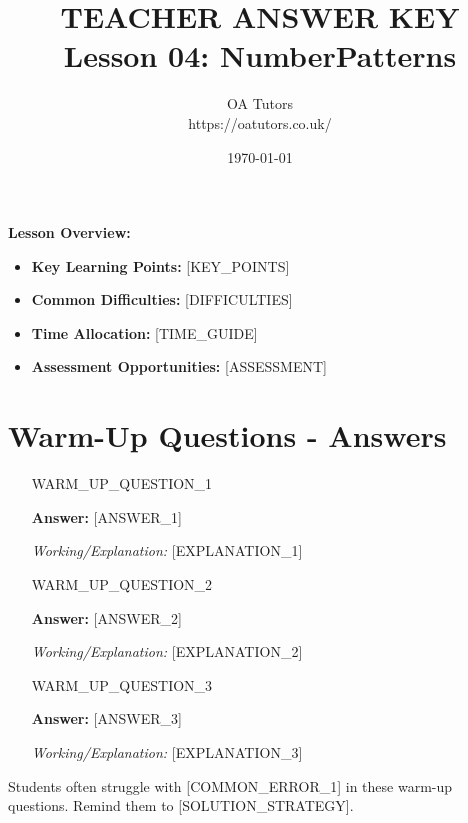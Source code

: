 \documentclass[a4paper,12pt]{article}
\begin{document}
\title{\textcolor{oared}{\Huge TEACHER ANSWER KEY} \\ 
       \textcolor{oablue}{\Large Lesson 04: NumberPatterns}}
\author{\textcolor{oablue}{OA Tutors} \\ 
        \textcolor{oagray}{https://oatutors.co.uk/}}
\date{\textcolor{oagray}{\today}}

\maketitle

\begin{teachingtip}
\textbf{Lesson Overview:}
\begin{itemize}
    \item \textbf{Key Learning Points:} [KEY_POINTS]
    \item \textbf{Common Difficulties:} [DIFFICULTIES]
    \item \textbf{Time Allocation:} [TIME_GUIDE]
    \item \textbf{Assessment Opportunities:} [ASSESSMENT]
\end{itemize}
\end{teachingtip}

\section{Warm-Up Questions - Answers}

\begin{enumerate}
    \item [WARM_UP_QUESTION_1]
    
    \textcolor{oared}{\textbf{Answer:} [ANSWER_1]}
    
    \textit{Working/Explanation:} [EXPLANATION_1]
    
    \item [WARM_UP_QUESTION_2]
    
    \textcolor{oared}{\textbf{Answer:} [ANSWER_2]}
    
    \textit{Working/Explanation:} [EXPLANATION_2]
    
    \item [WARM_UP_QUESTION_3]
    
    \textcolor{oared}{\textbf{Answer:} [ANSWER_3]}
    
    \textit{Working/Explanation:} [EXPLANATION_3]
\end{enumerate}

\begin{commonerror}
Students often struggle with [COMMON_ERROR_1] in these warm-up questions. 
Remind them to [SOLUTION_STRATEGY].
\end{commonerror}
\end{document}
